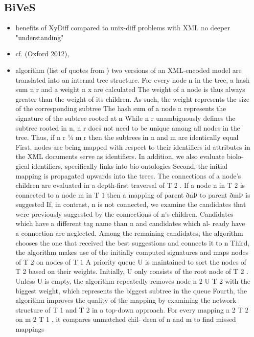 	\subsection{BiVeS}
	\begin{itemize}
		\item benefits of XyDiff compared to unix-diff
		\subitem problems with XML
		\subitem no deeper "understanding"
		\item cf. \cite{Waltemath2013} (Oxford 2012), \cite{Scharm2015}
		\item algorithm (list of quotes from \cite{Scharm2015})
		\subitem two versions of an XML-encoded model are translated into an internal tree structure. For every node n in the tree, a hash sum n r and a weight n x are calculated 
		\subitem The weight of a node is thus always greater than the weight of its children. As such, the weight represents the size of the corresponding subtree 
		\subitem The hash sum of a node n represents the signature of the subtree rooted at n 
		\subitem While n r unambiguously defines the subtree rooted in n, n r does not need to be unique among all nodes in the tree. Thus, if n r ¼ m r then the subtrees in n and m are identically equal 
		\subitem First, nodes are being mapped with respect to their identifiers 
		\subitem id attributes in the XML documents serve as identifiers. In addition, we also evaluate biolo- gical identifiers, specifically links into bio-ontologies 
		\subitem Second, the initial mapping is propagated upwards into the trees. 
		\subitem The connections of a node’s children are evaluated in a depth-first traversal of T 2 . If a node n in T 2 is connected to a node m in T 1 then a mapping of parent ðnÞ to parent ðmÞ is suggested 
		\subitem If, in contrast, n is not connected, we examine the candidates that were previously suggested by the connections of n’s children. 
		\subitem Candidates which have a different tag name than n and candidates which al- ready have a connection are neglected. 
		\subitem Among the remaining candidates, the algorithm chooses the one that received the best suggestions and connects it to n 
		\subitem Third, the algorithm makes use of the initially computed signatures and maps nodes of T 2 on nodes of T 1 
		\subitem A priority queue U is maintained to sort the nodes of T 2 based on their weights. Initially, U only consists of the root node of T 2 . 
		\subitem Unless U is empty, the algorithm repeatedly removes node n 2 U  T 2 with the biggest weight, which represents the biggest subtree in the queue 
		\subitem Fourth, the algorithm improves the quality of the mapping by examining the network structure of T 1 and T 2 in a top-down approach. For every mapping n 2 T 2 on m 2 T 1 , it compares unmatched chil- dren of n and m to find missed mappings 

\end{itemize}
